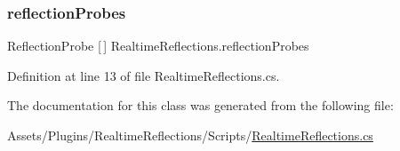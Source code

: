 \subsubsection{\texorpdfstring{reflection\+Probes}{reflectionProbes}}
{\footnotesize\ttfamily Reflection\+Probe \mbox{[}$\,$\mbox{]} Realtime\+Reflections.\+reflection\+Probes}



Definition at line 13 of file Realtime\+Reflections.\+cs.



The documentation for this class was generated from the following file\+:\begin{DoxyCompactItemize}
\item 
Assets/\+Plugins/\+Realtime\+Reflections/\+Scripts/\mbox{\hyperlink{_realtime_reflections_8cs}{Realtime\+Reflections.\+cs}}\end{DoxyCompactItemize}
